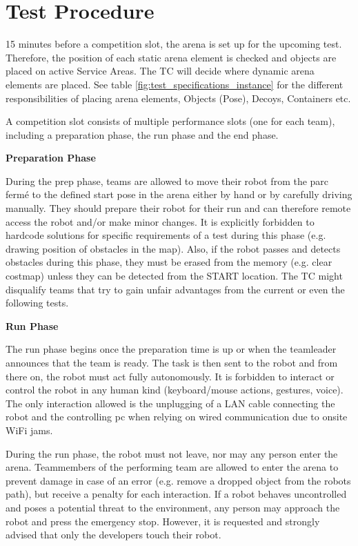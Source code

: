 \section{Test Procedure}

15 minutes before a competition slot, the arena is set up for the upcoming test.
Therefore, the position of each static arena element is checked and objects are placed on active 
Service Areas.
The TC will decide where dynamic arena elements are placed. See table \ref{fig:test_specifications_instance} for the different responsibilities of placing arena elements, Objects (Pose), Decoys, Containers etc.

A competition slot consists of multiple performance slots (one for each team), 
including a preparation phase, the run phase and the end phase.

\textbf{Preparation Phase}

During the prep phase, teams are allowed to move their robot from the parc ferm\'e to the defined start pose in the arena either by hand or by carefully driving manually. They should prepare their robot for their run and can therefore remote access the robot and/or make minor changes.
It is explicitly forbidden to hardcode solutions for specific requirements of a test during this phase (e.g. drawing position of obstacles in the map). Also, if the robot passes and detects obstacles during this phase, they must be erased from the memory (e.g. clear costmap) unless they can be detected from the START location. The TC might disqualify teams that try to gain unfair advantages from the current or even the following tests.

\textbf{Run Phase}

The run phase begins once the preparation time is up or when the teamleader announces that the team is ready. 
The task is then sent to the robot and from there on, the robot must act fully autonomously. 
It is forbidden to interact or control the robot in any human kind (keyboard/mouse actions, gestures, voice). 
The only interaction allowed is the unplugging of a LAN cable connecting the robot and the controlling pc
when relying on wired communication due to onsite WiFi jams.

During the run phase, the robot must not leave, nor may any person enter the arena.
Teammembers of the performing team are allowed to enter the arena to prevent damage in case of an error (e.g. remove a dropped object from the robots path), but receive a penalty for each interaction.
If a robot behaves uncontrolled and poses a potential threat to the environment,
any person may approach the robot and press the emergency stop.
However, it is requested and strongly advised that only the developers touch their robot.

